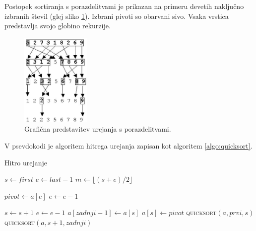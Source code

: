 \documentclass[a4paper,oneside,12pt]{article}
\begin{document}
Postopek sortiranja s porazdelitvami je prikazan na primeru devetih naključno
izbranih števil (glej sliko \ref{fig:quicksortimage}). Izbrani pivoti so obarvani sivo.
Vsaka vrstica predstavlja svojo globino rekurzije.

\begin{figure}[h]
    \begin{center}
        \includegraphics[height=45mm]{slike/quicksort.jpg}
    \end{center}
    \vspace{-0.7cm}
    \caption[Hitro urejanje]{Grafična predstavitev urejanja s porazdelitvami.}
    \label{fig:quicksortimage}
\end{figure}

V psevdokodi je algoritem hitrega urejanja zapisan kot algoritem \ref{algo:quicksort}.

\begin{algorithm}
  \caption{Hitro urejanje}\label{algo:quicksort}
  \begin{algorithmic}[1]
         \Return \EndIf
        \State $s \gets first$
        \State $e \gets last - 1$
        \State $m \gets \lfloor(s+e)/2\rfloor$
        \EndIf

        \State $pivot \gets a[e]$
        \State $e \gets e - 1$

                \State $s \gets s + 1$
            \EndWhile
                \State $e \gets e - 1$
            \EndWhile
            \EndIf
        \EndWhile
        \State $a[zadnji - 1] \gets a[s]$
        \State $a[s] \gets pivot$
        \State \textsc{quicksort}$(a, prvi, s)$
        \State \textsc{quicksort}$(a, s + 1, zadnji)$
    \EndFunction
  \end{algorithmic}
\end{algorithm}
\end{document}
